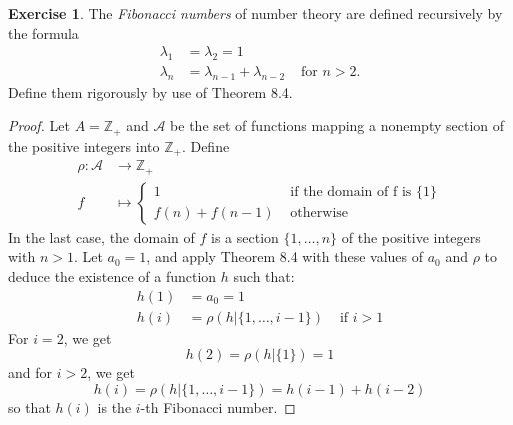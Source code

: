 \documentclass[11pt,a4paper,twoside]{article}
\theoremstyle{definition}
\newcounter{excounter}
\newtheorem{exercise}[excounter]{Exercise}
\begin{document}
\begin{exercise}

  The \emph{Fibonacci numbers} of number theory are defined recursively by the formula
  \begin{align*}
    \lambda_1 &= \lambda_2 = 1 \\
    \lambda_n &= \lambda_{n - 1} + \lambda_{n - 2} &\text{ for } n > 2.
  \end{align*}
  Define them rigorously by use of Theorem 8.4.

\end{exercise}

\begin{proof}

  Let $A = \mathbb{Z}_+$ and $\mathscr{A}$ be the set of functions mapping a nonempty section of the positive integers into $\mathbb{Z}_+$.
  Define
  \begin{align*}
    \rho : \mathscr{A} &\to \mathbb{Z}_+ \\
    f &\mapsto \begin{cases}
      1 &\text{ if the domain of f is } \{ 1 \} \\
      f (n) + f (n - 1) &\text{ otherwise }
    \end{cases}
  \end{align*}
  In the last case, the domain of $f$ is a section $\{ 1, \dotsc, n \}$ of the positive integers with $n > 1$. Let $a_0 = 1$, and apply
  Theorem 8.4 with these values of $a_0$ and $\rho$ to deduce the existence of a function $h$ such that:
  \begin{align*}
    h (1) &= a_0 = 1 \\
    h (i) &= \rho (h | \{ 1, \dotsc, i - 1 \}) &\text{ if } i > 1
  \end{align*}
  For $i = 2$, we get
  \begin{equation*}
    h (2) = \rho ( h | \{ 1 \} ) = 1
  \end{equation*}
  and for $i > 2$, we get
  \begin{equation*}
    h (i) = \rho ( h | \{ 1, \dotsc, i - 1 \} ) = h (i - 1) + h (i - 2)
  \end{equation*}
  so that $h (i)$ is the $i$-th Fibonacci number.

\end{proof}
\end{document}
